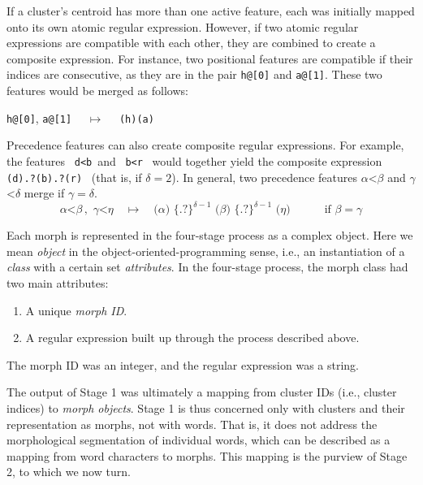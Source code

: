 {If a cluster's centroid has more than one active feature, each
was initially mapped onto its own atomic regular expression.
However, if two atomic regular expressions are compatible with each other, 
they are combined to create a composite expression. For instance, two 
positional features are compatible if their indices are consecutive, 
as they are in the pair \texttt{h@[0]} and \texttt{a@[1]}. These two features would be
merged as follows:
\begin{center}
\texttt{h@[0]}, \texttt{a@[1]} $\quad \mapsto \quad$ \texttt{(h)(a)}
\end{center}
Precedence features 
can also create composite regular expressions. For example, the 
features \, \texttt{d<b}\,  and \, \texttt{b<r} \, would together yield the 
composite expression \, \texttt{(d).?(b).?(r)} \, (that is, if $\delta = 2$). 
In general, two precedence features $\alpha$<$\beta$ and $\gamma$<$\delta$
merge if $\gamma=\delta$.
\begin{equation}
\alpha\texttt{<} \beta \, ,\,\, \gamma \texttt{<} \eta  \quad \mapsto \quad \texttt{(} \alpha \texttt{)}  \,\, 
{\{\texttt{.?}\}}^{\delta-1} \,\, \texttt{(}\beta \texttt{)} \,\,{\{\texttt{.?}\}}^{\delta-1} \, \, \texttt{(} \eta \texttt{)} \qquad \quad \text{if $\beta = \gamma$} 
\end{equation}

Each morph is represented in the four-stage process as a complex object. Here 
we mean \emph{object} in the object-oriented-programming sense, i.e., an instantiation of a \emph{class} with a certain set \emph{attributes}.
In the four-stage process, the morph class had two main attributes:
\begin{enumerate}
\item A unique \emph{morph ID}.
\item A regular expression built up through the process described above.
\end{enumerate}
The morph ID was an integer, and the regular expression was a string.

The output of Stage 1 was ultimately a mapping from cluster IDs (i.e., cluster indices) to \emph{morph objects}.
Stage 1 is thus concerned only with clusters and their representation as morphs, not with words. That is,
it does not address the morphological segmentation of individual words, which can
be described as a mapping from word characters to morphs. This mapping is the purview of Stage 2,
to which we now turn.

}
